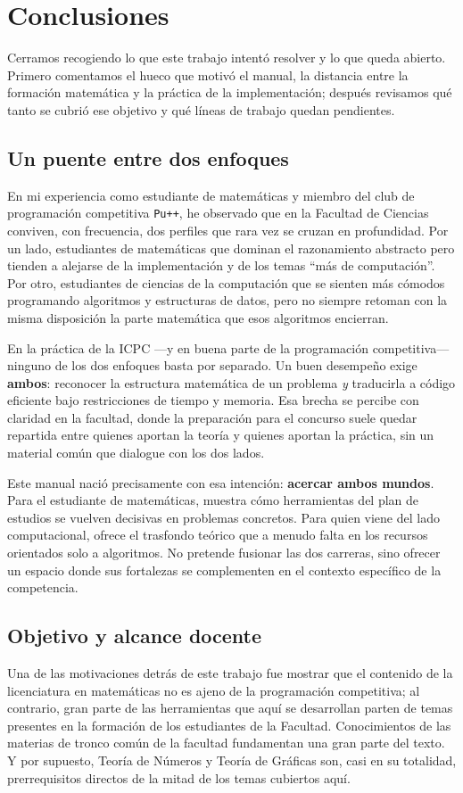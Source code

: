 
\section{Conclusiones}

Cerramos recogiendo lo que este trabajo intentó resolver y lo que queda abierto. Primero comentamos el hueco que motivó el manual, la distancia entre la formación matemática y la práctica de la implementación; después revisamos qué tanto se cubrió ese objetivo y qué líneas de trabajo quedan pendientes.

\subsection{Un puente entre dos enfoques}

En mi experiencia como estudiante de matemáticas y miembro del club de programación competitiva \texttt{Pu++}, he observado que en la Facultad de Ciencias conviven, con frecuencia, dos perfiles que rara vez
se cruzan en profundidad. Por un lado, estudiantes de matemáticas que dominan
el razonamiento abstracto pero tienden a alejarse de la implementación y de
los temas ``más de computación''. Por otro, estudiantes de ciencias de la
computación que se sienten más cómodos programando algoritmos y estructuras de
datos, pero no siempre retoman con la misma disposición la parte matemática
que esos algoritmos encierran.

En la práctica de la ICPC ---y en buena parte de la programación competitiva---
ninguno de los dos enfoques basta por separado. Un buen desempeño exige
\textbf{ambos}: reconocer la estructura matemática de un problema \emph{y}
traducirla a código eficiente bajo restricciones de tiempo y memoria. Esa
brecha se percibe con claridad en la facultad, donde la preparación para el
concurso suele quedar repartida entre quienes aportan la teoría y quienes
aportan la práctica, sin un material común que dialogue con los dos lados.

Este manual nació precisamente con esa intención: \textbf{acercar ambos mundos}.
Para el estudiante de matemáticas, muestra cómo herramientas del plan de
estudios se vuelven decisivas en problemas concretos. Para quien viene del
lado computacional, ofrece el trasfondo teórico que a menudo falta en los
recursos orientados solo a algoritmos. No pretende fusionar las dos carreras,
sino ofrecer un espacio donde sus fortalezas se complementen en el contexto
específico de la competencia.

\subsection{Objetivo y alcance docente}
Una de las motivaciones detrás de este trabajo fue mostrar que el contenido de la licenciatura en matemáticas no es ajeno de la programación competitiva; al contrario, gran parte de las herramientas que aquí se desarrollan parten de temas presentes en la formación de los estudiantes de la Facultad. Conocimientos de las materias de tronco común de la facultad fundamentan una gran parte del texto. Y por supuesto, Teoría de Números y Teoría de Gráficas son, casi en su totalidad, prerrequisitos directos de la mitad de los temas cubiertos aquí.

